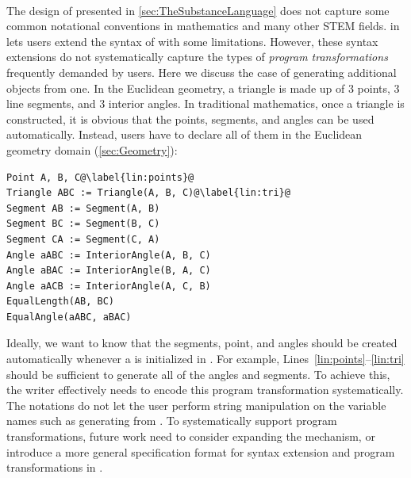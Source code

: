 
\paragraph{\inlineSUB{\Substance{}}} The design of \Substance{} presented in \cref{sec:TheSubstanceLanguage} does not capture some common notational conventions in mathematics and many other STEM fields.  in \Domain lets users extend the syntax of \Substance{} with some limitations. However, these syntax extensions do not systematically capture the types of \textit{program transformations} frequently demanded by \Penrose{} users. Here we discuss the case of generating additional \Substance{} objects from one. In the Euclidean geometry, a triangle is made up of 3 points, 3 line segments, and 3 interior angles. In traditional mathematics, once a triangle is constructed, it is obvious that the points, segments, and angles can be used automatically. Instead, users have to declare all of them in the Euclidean geometry domain (\cref{sec:Geometry}):

\vspace{1em}
\begin{mdframed}[style=SUBCode]
\begin{lstlisting}[language=Sub-geom,escapechar=@]
Point A, B, C@\label{lin:points}@
Triangle ABC := Triangle(A, B, C)@\label{lin:tri}@
Segment AB := Segment(A, B)
Segment BC := Segment(B, C)
Segment CA := Segment(C, A)
Angle aABC := InteriorAngle(A, B, C)
Angle aBAC := InteriorAngle(B, A, C)
Angle aACB := InteriorAngle(A, C, B)
EqualLength(AB, BC)
EqualAngle(aABC, aBAC)
\end{lstlisting}
\end{mdframed}
\vspace{1em}

Ideally, we want \Penrose to know that the segments, point, and angles should be created automatically whenever a  is initialized in \Substance. For example, Lines~\ref{lin:points}--\ref{lin:tri} should be sufficient to generate all of the angles and segments. To achieve this, the \Domain{} writer effectively needs to encode this program transformation systematically. The \Domain{} notations do not let the user perform string manipulation on the variable names such as generating  from . To systematically support program transformations, future work need to consider expanding the  mechanism, or introduce a more general specification format for syntax extension and program transformations in \Domain{}.

